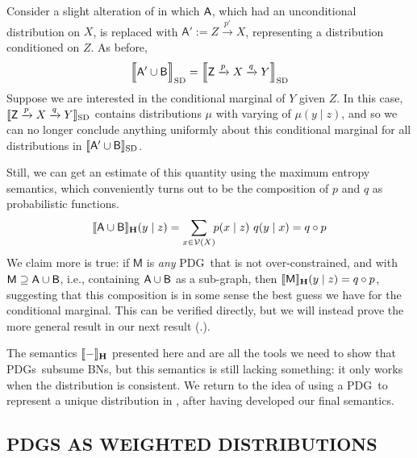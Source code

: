 \documentclass{article}
\newcommand\SD{_{\text{SD}}}
\newcommand\MaxEnt{_{\mathbf H}}
\newcommand{\V}{\mathcal V}
\newcommand{\sfM}{\mathsf M}
\newcommand{\MN}{PDG}
\newcommand{\MNs}{\MN s}
\numberwithin{equation}{section}
\begin{document}
	\begin{example}[composition]
		Consider a slight alteration of  in which $\sf A$, which had an unconditional distribution on $X$, is replaced with $\mathsf A' := Z \xrightarrow{p'} X$, representing a distribution conditioned on $Z$. 
		As before,
		\[ \bbr[\Big]{{\sf A' \cup B}}\SD = \bbr[\Big]{{\mathsf Z} \xrightarrow{p} X \xrightarrow{q} Y}\SD \]
		Suppose we are interested in the conditional marginal of $Y$ given $Z$. In this case, $\bbr{{\mathsf Z} \xrightarrow{p} X \xrightarrow{q} Y}\SD $ contains distributions $\mu$ with varying of $\mu(y \mid z)$, and so we can no longer conclude anything uniformly about this conditional marginal for all distributions in $\bbr{{\sf A' \cup B}}\SD$. 
		
		Still, we can get an estimate of this quantity using the maximum entropy semantics, which conveniently turns out to be the composition of $p$ and $q$ as probabilistic functions.
		$$ \bbr{{\sf A \cup B}}\MaxEnt(y \mid z) = \sum_{x \in \V(X)}\!\! p (x \mid z)\ q(y \mid x) = q \circ p $$
		We claim more is true: if $\sfM$ is \emph{any} \MN\ that is not over-constrained, and with $\sfM \supseteq \sf A \cup B$, i.e., containing $\sf A \cup B$ as a sub-graph, then
		$ \bbr{\sfM}\MaxEnt(y \mid z) = q \circ p$,
		suggesting that this composition is in some sense the best guess we have for the conditional marginal. 
		This can be verified directly, but we will instead prove the more general result in our next result (.).
	\end{example}

	The semantics $\bbr{-}\MaxEnt$ presented here and  are all the tools we need to show that \MNs\ subsume BNs, but this semantics is still lacking something: it only works when the distribution is consistent.
	We return to the idea of using a \MN\ to represent a unique distribution in , after having developed our final semantics. 

	\subsection{\MN S AS WEIGHTED DISTRIBUTIONS} \label{sec:weighted-semantics}
	
\end{document}
